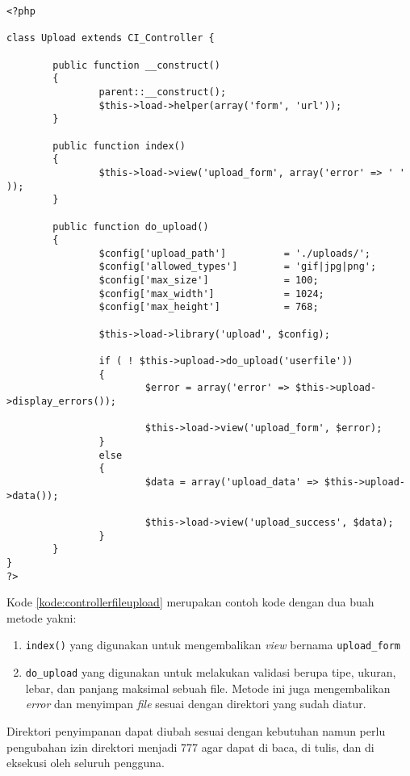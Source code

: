 \begin{lstlisting}[caption=Contoh \textit{controller} untuk melakukan validasi dan penyimpanan, label=kode:controllerfileupload]
<?php

class Upload extends CI_Controller {

        public function __construct()
        {
                parent::__construct();
                $this->load->helper(array('form', 'url'));
        }

        public function index()
        {
                $this->load->view('upload_form', array('error' => ' ' ));
        }

        public function do_upload()
        {
                $config['upload_path']          = './uploads/';
                $config['allowed_types']        = 'gif|jpg|png';
                $config['max_size']             = 100;
                $config['max_width']            = 1024;
                $config['max_height']           = 768;

                $this->load->library('upload', $config);

                if ( ! $this->upload->do_upload('userfile'))
                {
                        $error = array('error' => $this->upload->display_errors());

                        $this->load->view('upload_form', $error);
                }
                else
                {
                        $data = array('upload_data' => $this->upload->data());

                        $this->load->view('upload_success', $data);
                }
        }
}
?>
\end{lstlisting}

Kode \ref{kode:controllerfileupload} merupakan contoh kode dengan dua buah metode yakni:
\begin{enumerate}
\item \verb|index()| yang digunakan untuk mengembalikan \textit{view} bernama \texttt{upload\_form}
\item \verb|do_upload| yang digunakan untuk melakukan validasi berupa tipe, ukuran, lebar, dan panjang maksimal sebuah file. Metode ini juga mengembalikan \textit{error} dan menyimpan \textit{file} sesuai dengan direktori yang sudah diatur.
\end{enumerate}
Direktori penyimpanan dapat diubah sesuai dengan kebutuhan namun perlu pengubahan izin direktori menjadi 777 agar dapat di baca, di tulis, dan di eksekusi oleh seluruh pengguna.


